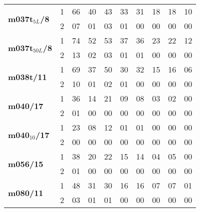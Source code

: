 \begin{tabular}{lccccccccc}
\midrule
\multirow{2}{*}{ \bf m037t$_{5L}$/8}
& 1   & 66  & 40  & 43  & 33  & 31  & 18  & 18  & 10 \\ 
& 2   & 07  & 01  & 03  & 01  & 00  & 00  & 00  & 00 \\ 
\midrule
\multirow{2}{*}{ \bf m037t$_{50L}$/8}
& 1   & 74  & 52  & 53  & 37  & 36  & 23  & 22  & 12 \\ 
& 2   & 13  & 02  & 03  & 01  & 01  & 00  & 00  & 00 \\ 
\midrule
\multirow{2}{*}{ \bf m038t/11}
& 1   & 69  & 37  & 50  & 30  & 32  & 15  & 16  & 06 \\ 
& 2   & 10  & 01  & 02  & 01  & 00  & 00  & 00  & 00 \\ 
\midrule
\multirow{2}{*}{ \bf m040/17}
& 1   & 36  & 14  & 21  & 09  & 08  & 03  & 02  & 00 \\ 
& 2   & 01  & 00  & 00  & 00  & 00  & 00  & 00  & 00 \\ 
\midrule
\multirow{2}{*}{ \bf m040$_{10}$/17}
& 1   & 23  & 08  & 12  & 01  & 01  & 00  & 00  & 00 \\ 
& 2   & 00  & 00  & 00  & 00  & 00  & 00  & 00  & 00 \\ 
\midrule
\multirow{2}{*}{ \bf m056/15}
& 1   & 38  & 20  & 22  & 15  & 14  & 04  & 05  & 00 \\ 
& 2   & 01  & 00  & 00  & 00  & 00  & 00  & 00  & 00 \\ 
\midrule
\multirow{2}{*}{ \bf m080/11}
& 1   & 48  & 31  & 30  & 16  & 16  & 07  & 07  & 01 \\ 
& 2   & 03  & 01  & 01  & 00  & 00  & 00  & 00  & 00 \\ 
\bottomrule
\end{tabular}
